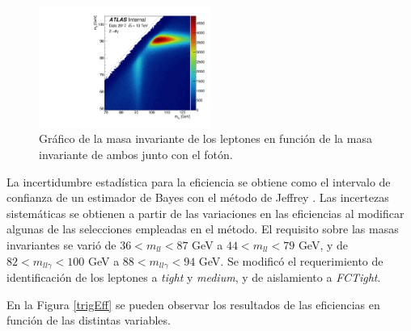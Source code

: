 \begin{figure}
\centering

  \includegraphics[width=0.5\textwidth]{images/h_mllg_mll.pdf}
	\caption{Gráfico de la masa invariante de los leptones en función de la masa invariante de ambos junto con el fotón. 
}

  \label{mllgmll}
\end{figure}

La incertidumbre estadística para la eficiencia se obtiene como el intervalo de confianza de un estimador de Bayes con el método de Jeffrey \cite{jeffrey} 
. Las incertezas sistemáticas se obtienen a partir de las variaciones en las eficiencias al modificar algunas de las selecciones empleadas en el método. El requisito sobre las masas invariantes se varió de $36<m_{ll}<87$ GeV a $44<m_{ll}<79$ GeV, y de 
$82<m_{ll\gamma}<100$ GeV a $88<m_{ll\gamma}<94$ GeV. Se modificó el requerimiento de identificación de los leptones a \textit{tight} y \textit{medium}, y de aislamiento a \textit{FCTight}. 

En la Figura \ref{trigEff} se pueden observar los resultados de las eficiencias en función de las distintas variables. 



